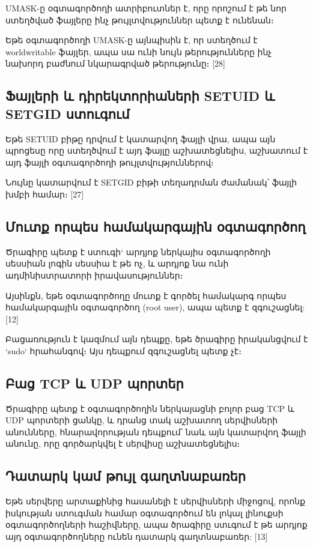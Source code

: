 \documentclass[10pt]{article}
\begin{document}
\begin{sloppypar}
UMASK-ը օգտագործողի ատրիբուտներ է, որը
որոշում է թե նոր ստեղծված ֆայլերը ինչ թույլտվություններ
պետք է ունենան։

Եթե օգտագործողի UMASK-ը այնպիսին է, որ ստեղծում է
worldwritable ֆայլեր, ապա սա ունի նույն թերությունները
ինչ նախորդ բաժնում նկարագրված թերությունը։
[28]


\subsection{Ֆայլերի և դիրեկտորիաների SETUID և SETGID ստուգում}


Եթե SETUID բիթը դրվում է կատարվող ֆայլի վրա, ապա
այն պրոցեսը որը ստեղծվում է այդ ֆայլը աշխատեցնելիս,
աշխատում է այդ ֆայլի օգտագործողի թույլտվություններով։

Նույնը կատարվում է SETGID բիթի տեղադրման ժամանակ՝
ֆայլի խմբի համար։
[27]


\subsection{Մուտք որպես համակարգային օգտագործող}

Ծրագիրը պետք է ստուգի` արդյոք ներկայիս օգտագործողի սեսսիան
լոգին սեսսիա է թե ոչ, և արդյոք նա ունի ադմինիստրատորի
իրավասություններ։

Այսինքն, եթե օգտագործողը մուտք է գործել համակարգ որպես
համակարգային օգտագործող (root user), ապա պետք է զգուշացնել: [12]

Բացառություն է կազմում այն դեպքը, եթե ծրագիրը իրականցվում է
`sudo` հրահանգով։ Այս դեպքում զգուշացնել պետք չէ։


\subsection{Բաց TCP և UDP պորտեր}

Ծրագիրը պետք է օգտագործողին ներկայացնի բոլոր բաց 
TCP և UDP պորտերի ցանկը, և դրանց տակ աշխատող սերվիսների
անունները, հնարավորության դեպքում՝ նաև այն կատարվող
ֆայլի անունը, որը գործարկվել է սերվիսը աշխատեցնելիս։


\subsection{Դատարկ կամ թույլ գաղտնաբառեր}

Եթե սերվերը արտաքինից հասանելի է սերվիսների միջոցով,
որոնք իսկության ստուգման համար օգտագործում են լոկալ
լինուքսի օգտագործողների հաշիվները, ապա ծրագիրը ստւգում է
թե արդյոք այդ օգտագործողները ունեն դատարկ գաղտնաբառեր: [13]


\end{sloppypar}
\end{document}
